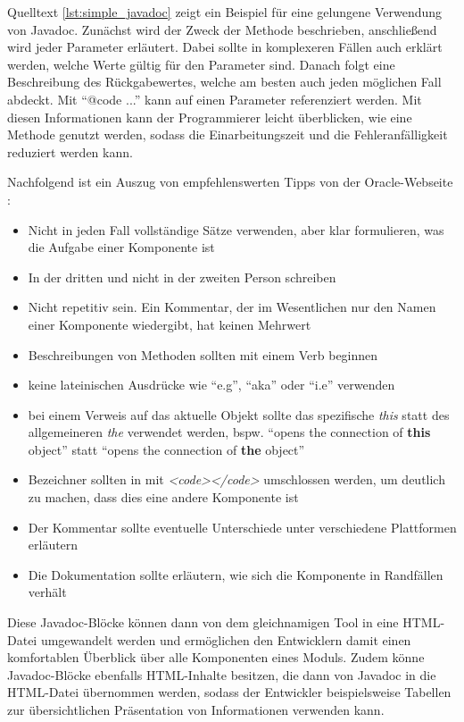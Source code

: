 Quelltext \ref{lst:simple_javadoc} zeigt ein Beispiel für eine gelungene Verwendung von Javadoc. Zunächst wird der Zweck der Methode beschrieben, anschließend wird jeder Parameter erläutert. Dabei sollte in komplexeren Fällen auch erklärt werden, welche Werte gültig für den Parameter sind. Danach folgt eine Beschreibung des Rückgabewertes, welche am besten auch jeden möglichen Fall abdeckt. Mit \enquote{{@code ...}} kann auf einen Parameter referenziert werden. Mit diesen Informationen kann der Programmierer leicht überblicken, wie eine Methode genutzt werden, sodass die Einarbeitungszeit und die Fehleranfälligkeit reduziert werden kann.  

Nachfolgend ist ein Auszug von empfehlenswerten Tipps von der Oracle-Webseite \cite{HowtoWriteDocCommentsfortheJavadocTool}:
\begin{itemize}
    \item Nicht in jeden Fall vollständige Sätze verwenden, aber klar formulieren, was die Aufgabe einer Komponente ist
    \item In der dritten und nicht in der zweiten Person schreiben
    \item Nicht repetitiv sein. Ein Kommentar, der im Wesentlichen nur den Namen einer Komponente wiedergibt, hat keinen Mehrwert
    \item  Beschreibungen von Methoden sollten mit einem Verb beginnen
    \item keine lateinischen Ausdrücke wie \enquote{e.g}, \enquote{aka} oder \enquote{i.e} verwenden
    \item bei einem Verweis auf das aktuelle Objekt sollte das spezifische \textit{this} statt des allgemeineren \textit{the} verwendet werden, bspw. \enquote{opens the connection of \textbf{this} object} statt \enquote{opens the connection of \textbf{the} object}
    \item Bezeichner sollten in mit \textit{<code></code>} umschlossen werden, um deutlich zu machen, dass dies eine andere Komponente ist
    \item Der Kommentar sollte eventuelle Unterschiede unter verschiedene Plattformen erläutern
    \item Die Dokumentation sollte erläutern, wie sich die Komponente in Randfällen verhält
    
\end{itemize}
Diese Javadoc-Blöcke können dann von dem gleichnamigen Tool in eine HTML-Datei umgewandelt werden und ermöglichen den Entwicklern damit einen komfortablen Überblick über alle Komponenten eines Moduls. Zudem könne Javadoc-Blöcke ebenfalls HTML-Inhalte besitzen, die dann von Javadoc in die HTML-Datei übernommen werden, sodass der Entwickler beispielsweise Tabellen zur übersichtlichen Präsentation  von Informationen verwenden kann. 

